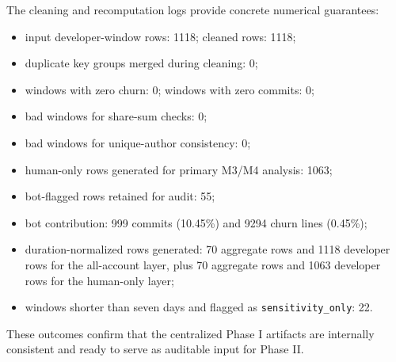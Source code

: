 The cleaning and recomputation logs provide concrete numerical guarantees:
\begin{itemize}[leftmargin=*]
  \item input developer-window rows: 1118; cleaned rows: 1118;
  \item duplicate key groups merged during cleaning: 0;
  \item windows with zero churn: 0; windows with zero commits: 0;
  \item bad windows for share-sum checks: 0;
  \item bad windows for unique-author consistency: 0;
  \item human-only rows generated for primary M3/M4 analysis: 1063;
  \item bot-flagged rows retained for audit: 55;
  \item bot contribution: 999 commits (10.45\%) and 9294 churn lines (0.45\%);
  \item duration-normalized rows generated: 70 aggregate rows and 1118 developer rows for the all-account layer, plus 70 aggregate rows and 1063 developer rows for the human-only layer;
  \item windows shorter than seven days and flagged as \texttt{sensitivity\_only}: 22.
\end{itemize}

These outcomes confirm that the centralized Phase I artifacts are internally consistent and ready
to serve as auditable input for Phase II.
